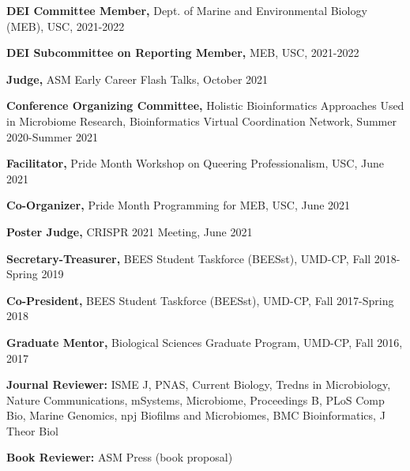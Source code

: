 \documentclass[]{res}
\begin{document}
\begin{resume}
{\bf DEI Committee Member,} {Dept. of Marine and Environmental Biology (MEB)}, USC, 2021-2022

{\bf DEI Subcommittee on Reporting Member,} {MEB}, USC, 2021-2022

{\bf Judge,} ASM Early Career Flash Talks, October 2021

{\bf Conference Organizing Committee,} {Holistic Bioinformatics Approaches Used in Microbiome Research}, Bioinformatics Virtual Coordination Network, Summer 2020-Summer 2021

{\bf Facilitator,} {Pride Month Workshop on Queering Professionalism}, USC, June 2021

{\bf Co-Organizer,} {Pride Month Programming for MEB}, USC, June 2021


{\bf Poster Judge,} {CRISPR 2021 Meeting}, June 2021

{\bf Secretary-Treasurer,} {BEES Student Taskforce (BEESst)}, UMD-CP, Fall 2018-Spring 2019 %

{\bf Co-President,} {BEES Student Taskforce (BEESst)}, UMD-CP, Fall 2017-Spring 2018

{\bf Graduate Mentor,} {Biological Sciences Graduate Program}, UMD-CP, Fall 2016, 2017 %

{\bf Journal Reviewer:} ISME J, PNAS, Current Biology, Tredns in Microbiology, Nature Communications, mSystems, Microbiome, Proceedings B, PLoS Comp Bio, Marine Genomics, npj Biofilms and Microbiomes, BMC Bioinformatics, J Theor Biol

{\bf Book Reviewer:} ASM Press (book proposal)


\end{resume}
\end{document}
